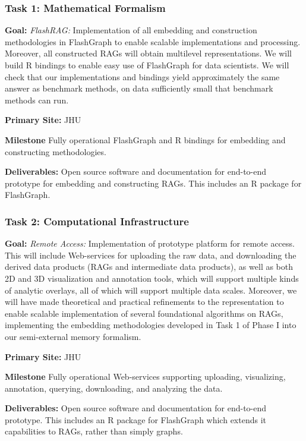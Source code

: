 \subsubsection{Task 1: Mathematical Formalism}
\begin{compactitem}
\item \textbf{Goal:} \emph{FlashRAG:} Implementation of all embedding and construction methodologies in FlashGraph to enable scalable implementations and processing.  Moreover, all constructed RAGs will obtain multilevel representations.  We will build R bindings to enable easy use of FlashGraph for data scientists.  We will check that our implementations and bindings yield approximately the same answer as benchmark methods, on data sufficiently small that benchmark methods can run.
\item \textbf{Primary Site:} JHU
\item \textbf{Milestone} Fully operational FlashGraph and R bindings for embedding and constructing methodologies.
\item \textbf{Deliverables:} Open source software and documentation for end-to-end prototype for embedding and constructing RAGs. This includes an R package for FlashGraph.
\end{compactitem}


\subsubsection{Task 2: Computational Infrastructure}
\begin{compactitem}
\item \textbf{Goal:} \emph{Remote Access:} Implementation of prototype platform for remote access. This will include Web-services for uploading the raw data, and downloading the derived data products (RAGs and intermediate data products), as well as both 2D and 3D visualization and annotation tools, which will support multiple kinds of analytic overlays, all of which will support multiple data scales. Moreover, we will have made theoretical and practical refinements to the representation to enable scalable implementation of several foundational algorithms on RAGs, implementing the embedding methodologies developed in Task 1 of Phase I into our semi-external memory formalism.
\item \textbf{Primary Site:} JHU
\item \textbf{Milestone} Fully operational Web-services supporting uploading, visualizing, annotation, querying, downloading, and analyzing the data.
\item \textbf{Deliverables:} Open source software and documentation for end-to-end prototype. This includes an R package for FlashGraph which extends it capabilities to RAGs, rather than simply graphs.
\end{compactitem}



